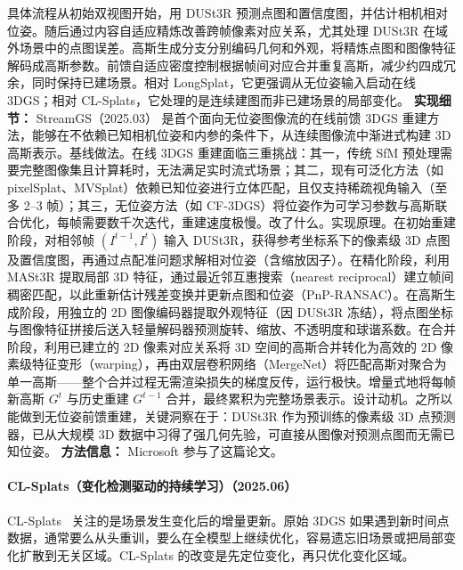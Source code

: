 具体流程从初始双视图开始，用 DUSt3R 预测点图和置信度图，并估计相机相对位姿。随后通过内容自适应精炼改善跨帧像素对应关系，尤其处理 DUSt3R 在域外场景中的点图误差。高斯生成分支分别编码几何和外观，将精炼点图和图像特征解码成高斯参数。前馈自适应密度控制根据帧间对应合并重复高斯，减少约四成冗余，同时保持已建场景。相对 LongSplat，它更强调从无位姿输入启动在线 3DGS；相对 CL-Splats，它处理的是连续建图而非已建场景的局部变化。
\textbf{实现细节：} StreamGS（2025.03） 是首个面向无位姿图像流的在线前馈 3DGS 重建方法，能够在不依赖已知相机位姿和内参的条件下，从连续图像流中渐进式构建 3D 高斯表示。基线做法。在线 3DGS 重建面临三重挑战：其一，传统 SfM 预处理需要完整图像集且计算耗时，无法满足实时流式场景；其二，现有可泛化方法（如 pixelSplat、MVSplat）依赖已知位姿进行立体匹配，且仅支持稀疏视角输入（至多 2--3 帧）；其三，无位姿方法（如 CF-3DGS）将位姿作为可学习参数与高斯联合优化，每帧需要数千次迭代，重建速度极慢。改了什么。实现原理。在初始重建阶段，对相邻帧 $(I^{t-1}, I^t)$ 输入 DUSt3R，获得参考坐标系下的像素级 3D 点图及置信度图，再通过点配准问题求解相对位姿（含缩放因子）。在精化阶段，利用 MASt3R 提取局部 3D 特征，通过最近邻互惠搜索（nearest reciprocal）建立帧间稠密匹配，以此重新估计残差变换并更新点图和位姿（PnP-RANSAC）。在高斯生成阶段，用独立的 2D 图像编码器提取外观特征（因 DUSt3R 冻结），将点图坐标与图像特征拼接后送入轻量解码器预测旋转、缩放、不透明度和球谐系数。在合并阶段，利用已建立的 2D 像素对应关系将 3D 空间的高斯合并转化为高效的 2D 像素级特征变形（warping），再由双层卷积网络（MergeNet）将匹配高斯对聚合为单一高斯——整个合并过程无需渲染损失的梯度反传，运行极快。增量式地将每帧新高斯 $G^t$ 与历史重建 $G^{t-1}$ 合并，最终累积为完整场景表示。设计动机。之所以能做到无位姿前馈重建，关键洞察在于：DUSt3R 作为预训练的像素级 3D 点预测器，已从大规模 3D 数据中习得了强几何先验，可直接从图像对预测点图而无需已知位姿。
\textbf{方法信息：} Microsoft 参与了这篇论文。
\paragraph{CL-Splats（变化检测驱动的持续学习）（2025.06）}
CL-Splats~\cite{2506_21117} 关注的是场景发生变化后的增量更新。原始 3DGS 如果遇到新时间点数据，通常要么从头重训，要么在全模型上继续优化，容易遗忘旧场景或把局部变化扩散到无关区域。CL-Splats 的改变是先定位变化，再只优化变化区域。

